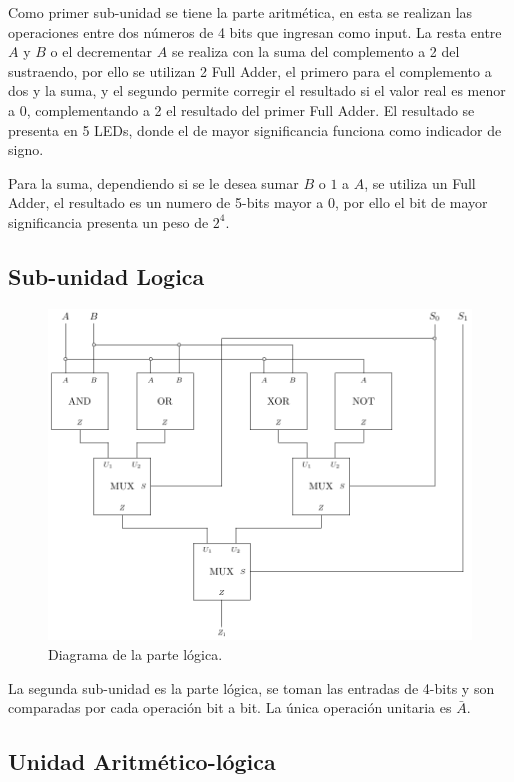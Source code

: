 \documentclass[journal, table]{IEEEtran}
\begin{document}
Como primer sub-unidad se tiene la parte aritmética, en esta se realizan las operaciones
entre dos números de 4 bits que ingresan como input. La resta entre $A$ y $B$
o el decrementar $A$ se realiza con la suma del complemento a 2 del sustraendo,
por ello se utilizan 2 Full Adder, el primero para el complemento a dos y la suma,
y el segundo permite corregir el resultado si el valor real es menor a 0,
complementando a 2 el resultado del primer Full Adder.
El resultado se presenta en 5 LEDs, donde el de mayor significancia funciona como indicador de signo.

Para la suma, dependiendo si se le desea sumar $B$ o $1$ a $A$, se utiliza un Full Adder,
el resultado es un numero de 5-bits mayor a 0, por ello el bit de mayor significancia
presenta un peso de $2^4$.

\subsection{Sub-unidad Logica}
\begin{figure}[h]
    \centering
    \includegraphics[width=\linewidth]{./Images/logik.pdf}
    \caption{Diagrama de la parte lógica.}
    \label{fig:logic-diagram}
\end{figure}

La segunda sub-unidad es la parte lógica, se toman las entradas de 4-bits y son
comparadas por cada operación bit a bit. La única operación unitaria es $\bar{A}$.

\subsection{Unidad Aritmético-lógica}
\end{document}
